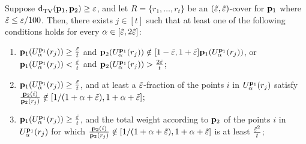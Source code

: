 \begin{lemma}\label{lem:bad-j}
  Suppose ${\operatorname{d}_{\textrm{TV}}^{}\!\left({\mathbf{p}_1, \mathbf{p}_2}\right)}\geq \varepsilon$, and let \mbox{$R=\{r_1,\dots,r_t\}$}
  be an $(\tilde{\varepsilon},\tilde{\varepsilon})$-cover for $\mathbf{p}_1$ where $\tilde{\varepsilon} \leq \varepsilon/100$.
  Then,
  there exists $j\in[t]$ such that at least one of the
  following conditions holds for every $\alpha \in [\tilde{\varepsilon},2\tilde{\varepsilon}]$:
    \begin{enumerate}
      \item  \label{lem:bad-j-a1}
        $\mathbf{p}_1( U^{\mathbf{p}_1}_{\alpha}(r_j) ) \geq \frac{\tilde{\varepsilon}}{t}$ and
        $\mathbf{p}_2( U^{\mathbf{p}_1}_{\alpha}(r_j) )
             \notin [1-\tilde{\varepsilon}, 1+\tilde{\varepsilon}]\mathbf{p}_1( U^{\mathbf{p}_1}_{\alpha}(r_j) )$,
             or
        $\mathbf{p}_1( U^{\mathbf{p}_1}_{\alpha}(r_j) ) < \frac{\tilde{\varepsilon}}{t}$ and
        \mbox{$\mathbf{p}_2(U^{\mathbf{p}_1}_{\alpha}(r_j) ) > \frac{2\tilde{\varepsilon}}{t}$;}
      \item \label{lem:bad-j-a2}
        $\mathbf{p}_1( U^{\mathbf{p}_1}_{\alpha}(r_j) ) \geq \frac{\tilde{\varepsilon}}{t}$,
        and at least a $\tilde{\varepsilon}$-fraction  of the points $i$
        in $U^{\mathbf{p}_1}_{\alpha}(r_j)$ satisfy
        \mbox{$\frac{\mathbf{p}_2(i)}{\mathbf{p}_2(r_j)}
          \notin[1/(1+\alpha+\tilde{\varepsilon}), 1+\alpha+\tilde{\varepsilon}]$};
      \item \label{lem:bad-j-a3}
        $\mathbf{p}_1( U^{\mathbf{p}_1}_{\alpha}(r_j) ) \geq \frac{\tilde{\varepsilon}}{t}$,
        and the total weight according to $\mathbf{p}_2$ of the points
        $i$ in $U^{\mathbf{p}_1}_{\alpha}(r_j)$ for which
        \mbox{$\frac{\mathbf{p}_2(i)}{\mathbf{p}_2(r_j)}
          \notin\left[1/(1+\alpha+\tilde{\varepsilon}), 1+\alpha+\tilde{\varepsilon}\right]$}
        is at least $\frac {\tilde{\varepsilon}^2}{t}$;
    \end{enumerate}
\end{lemma}


